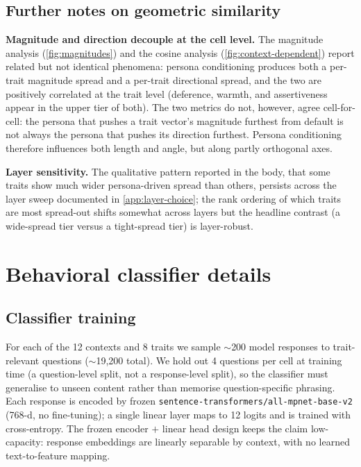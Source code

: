 \documentclass{article}
\theoremstyle{plain}
\theoremstyle{definition}
\theoremstyle{remark}
\begin{document}
\subsection{Further notes on geometric similarity}
\label{app:geo-sim}

\textbf{Magnitude and direction decouple at the cell level.} The magnitude analysis (\cref{fig:magnitudes}) and the cosine analysis (\cref{fig:context-dependent}) report related but not identical phenomena: persona conditioning produces both a per-trait magnitude spread and a per-trait directional spread, and the two are positively correlated at the trait level (deference, warmth, and assertiveness appear in the upper tier of both). The two metrics do not, however, agree cell-for-cell: the persona that pushes a trait vector's magnitude furthest from default is not always the persona that pushes its direction furthest. Persona conditioning therefore influences both length and angle, but along partly orthogonal axes.

\textbf{Layer sensitivity.} The qualitative pattern reported in the body, that some traits show much wider persona-driven spread than others, persists across the layer sweep documented in \cref{app:layer-choice}; the rank ordering of which traits are most spread-out shifts somewhat across layers but the headline contrast (a wide-spread tier versus a tight-spread tier) is layer-robust.

\newpage
\section{Behavioral classifier details}
\label{app:classifier}

\subsection{Classifier training}
\label{app:classifier-training}

For each of the 12 contexts and 8 traits we sample $\sim$200 model responses to trait-relevant questions ($\sim$19{,}200 total). We hold out 4 questions per cell at training time (a question-level split, not a response-level split), so the classifier must generalise to unseen content rather than memorise question-specific phrasing. Each response is encoded by frozen \texttt{sentence-transformers/all-mpnet-base-v2} (768-d, no fine-tuning); a single linear layer maps to 12 logits and is trained with cross-entropy. The frozen encoder $+$ linear head design keeps the claim low-capacity: response embeddings are linearly separable by context, with no learned text-to-feature mapping.
\end{document}
